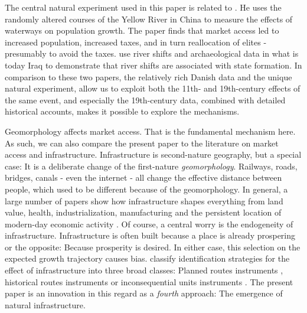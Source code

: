 \documentclass[11pt]{article}
\begin{document}
The central natural experiment used in this paper is related to \cite{Seror2020Random}. He uses the randomly altered courses of the Yellow River in China to measure the effects of waterways on population growth. The paper finds that market access led to increased population, increased taxes, and in turn reallocation of elites - presumably to avoid the taxes. \cite{Allen2023} use river shifts and archaeological data in what is today Iraq to demonstrate that river shifts are associated with state formation. In comparison to these two papers, the relatively rich Danish data and the unique natural experiment, allow us to exploit both the 11th- and 19th-century effects of the same event, and especially the 19th-century data, combined with detailed historical accounts, makes it possible to explore the mechanisms. 

Geomorphology affects market access. That is the fundamental mechanism here. As such, we can also compare the present paper to the literature on market access and infrastructure. Infrastructure is second-nature geography, but a special case: It is a deliberate change of the first-nature \textit{geomorphology}. Railways, roads, bridges, canals - even the internet - all change the effective distance between people, which used to be different because of the geomorphology. In general, a large number of papers show how infrastructure shapes everything from land value, health, industrialization, manufacturing and the persistent location of modern-day economic activity \citep{Donaldson2016, Berger2017, Berger2019a, Hornbeck2019, Bogart2019, Zimran2020a, Bogart2022, Hornbeck2024, Hornung2015}. Of course, a central worry is the endogeneity of infrastructure. Infrastructure is often built because a place is already prospering or the opposite: Because prosperity is desired. In either case, this selection on the expected growth trajectory causes bias. \cite{Redding2015} classify identification strategies for the effect of infrastructure into three broad classes: Planned routes instruments \citep{BaumSnow2007}, historical routes instruments \citep{Duranton2012} or inconsequential units instruments \citep{Berger2017}. The present paper is an innovation in this regard as a \textit{fourth} approach: The emergence of natural infrastructure.
\end{document}
